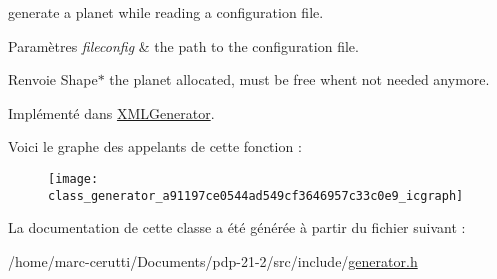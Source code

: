 generate a planet while reading a configuration file. 


\begin{DoxyParams}{Paramètres}
{\em fileconfig} & the path to the configuration file. \\
\hline
\end{DoxyParams}
\begin{DoxyReturn}{Renvoie}
Shape$\ast$ the planet allocated, must be free whent not needed anymore. 
\end{DoxyReturn}


Implémenté dans \hyperlink{class_x_m_l_generator_aea905ef316503fe716d368ae21f25b9b}{X\+M\+L\+Generator}.

Voici le graphe des appelants de cette fonction \+:\nopagebreak
\begin{figure}[H]
\begin{center}
\leavevmode
\texttt{[image: class\_generator\_a91197ce0544ad549cf3646957c33c0e9\_icgraph]}
\end{center}
\end{figure}


La documentation de cette classe a été générée à partir du fichier suivant \+:\begin{DoxyCompactItemize}
\item 
/home/marc-\/cerutti/\+Documents/pdp-\/21-\/2/src/include/\hyperlink{generator_8h}{generator.\+h}\end{DoxyCompactItemize}
